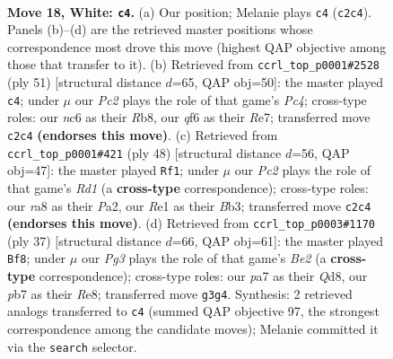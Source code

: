 \documentclass[11pt]{article}
\begin{document}
\clearpage

\begin{figure}[p]\centering
\begin{subfigure}{0.46\textwidth}\centering
\resizebox{\linewidth}{!}{%
\newchessgame
\chessboard[
  setfen={r3r1k1/pp5p/2nbpqp1/3p4/8/N2B2P1/PPP2P1P/R1Q1R1K1 w - - 0 18},
  showmover=false,
  pgfstyle=straightmove, color=movearrow, markmove={c2-c4}
]}
\caption{}
\end{subfigure}\hfill
\begin{subfigure}{0.46\textwidth}\centering
\resizebox{\linewidth}{!}{%
\newchessgame
\chessboard[
  setfen={1r4k1/2p1rp1p/6pQ/p1p5/1q1bP3/6BP/PP2RPP1/4R1K1 b - - 3 26},
  showmover=false,
  pgfstyle=straightmove, color=movearrow, markmove={c5-c4}
]}
\caption{}
\end{subfigure}
\\[4pt]
\begin{subfigure}{0.46\textwidth}\centering
\resizebox{\linewidth}{!}{%
\newchessgame
\chessboard[
  setfen={4r1k1/1bqprp1p/p5p1/1p6/3QP1R1/1BP3P1/PP5P/3R2K1 w - - 0 25},
  showmover=false,
  pgfstyle=straightmove, color=movearrow, markmove={d1-f1}
]}
\caption{}
\end{subfigure}\hfill
\begin{subfigure}{0.46\textwidth}\centering
\resizebox{\linewidth}{!}{%
\newchessgame
\chessboard[
  setfen={3qr1k1/1p2bpp1/6rp/p2p4/P3n3/4BN1P/1PP1RPP1/R2Q2K1 b - - 4 19},
  showmover=false,
  pgfstyle=straightmove, color=movearrow, markmove={e7-f8}
]}
\caption{}
\end{subfigure}
\caption{\textbf{Move 18, White: \texttt{c4}.} (a) Our position; Melanie plays \texttt{c4} (\texttt{c2c4}). Panels (b)--(d) are the retrieved master positions whose correspondence most drove this move (highest QAP objective among those that transfer to it). (b) Retrieved from \texttt{ccrl\_top\_p0001\#2528} (ply 51) [structural distance $d$=65, QAP obj=50]: the master played \texttt{c4}; under $\mu$ our \emph{Pc2} plays the role of that game's \emph{Pc4}; cross-type roles: our \emph{n}c6 as their \emph{R}b8, our \emph{q}f6 as their \emph{R}e7; transferred move \texttt{c2c4} \textbf{(endorses this move)}. (c) Retrieved from \texttt{ccrl\_top\_p0001\#421} (ply 48) [structural distance $d$=56, QAP obj=47]: the master played \texttt{Rf1}; under $\mu$ our \emph{Pc2} plays the role of that game's \emph{Rd1} (a \textbf{cross-type} correspondence); cross-type roles: our \emph{r}a8 as their \emph{P}a2, our \emph{R}e1 as their \emph{B}b3; transferred move \texttt{c2c4} \textbf{(endorses this move)}. (d) Retrieved from \texttt{ccrl\_top\_p0003\#1170} (ply 37) [structural distance $d$=66, QAP obj=61]: the master played \texttt{Bf8}; under $\mu$ our \emph{Pg3} plays the role of that game's \emph{Be2} (a \textbf{cross-type} correspondence); cross-type roles: our \emph{p}a7 as their \emph{Q}d8, our \emph{p}b7 as their \emph{R}e8; transferred move \texttt{g3g4}. Synthesis: 2 retrieved analogs transferred to \texttt{c4} (summed QAP objective 97, the strongest correspondence among the candidate moves); Melanie committed it via the \texttt{search} selector.}
\label{fig:thought-m34}
\end{figure}
\end{document}
